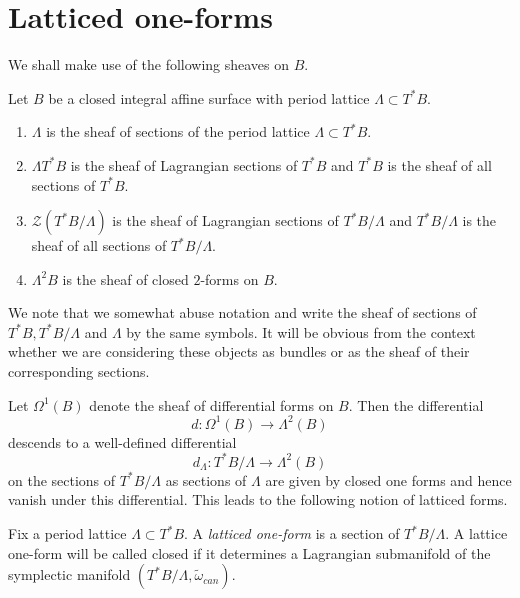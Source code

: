 \section{Latticed one-forms}
We shall make use of the following sheaves on $B$.
\begin{definition}
    Let $B$ be a closed integral affine surface with period lattice $\Lambda \subset T^*B$.
    \begin{enumerate}
        \item $\Lambda$ is the sheaf of sections of the period lattice $\Lambda \subset T^*B$.
        \item $\Lambda T^*B$ is the sheaf of Lagrangian sections of $T^*B$ and $T^*B$ is the sheaf of all sections of $T^*B$.
        \item $\mathcal{Z}(T^*B/\Lambda)$ is the sheaf of Lagrangian sections of $T^*B/\Lambda$ and $T^*B/\Lambda$ is the sheaf of all
              sections of $T^*B/\Lambda$.
        \item $\Lambda^2 B$ is the sheaf of closed $2$-forms on $B$.
    \end{enumerate}
\end{definition}
\begin{remark}
    We note that we somewhat abuse notation and write the sheaf of sections of $T^*B,T^*B/\Lambda$ and $\Lambda$ by the same symbols. It will be obvious
    from the context whether we are considering these objects as bundles or as the sheaf of their corresponding sections.
\end{remark}

\begin{remark} \label{rem:differential-descends}
    Let $\Omega^1(B)$ denote the sheaf of differential forms on $B$. Then the differential
    $$
        d :\Omega^1(B) \to \Lambda^2(B)
    $$
    descends to a well-defined differential
    $$
        d_{\Lambda}: T^*B/\Lambda \to \Lambda^2(B)
    $$
    on the sections of $T^*B/\Lambda$ as sections of $\Lambda$ are given by closed one forms and hence vanish under this differential. This leads to the following notion of latticed forms.
\end{remark}

\begin{definition}
    Fix a period lattice $\Lambda \subset T^*B$. A \emph{latticed one-form} is a section of $T^*B/\Lambda$. A lattice one-form
    will be called closed if it determines a Lagrangian submanifold of the symplectic manifold $(T^*B/\Lambda, \tilde{\omega}_{can})$.
\end{definition}

